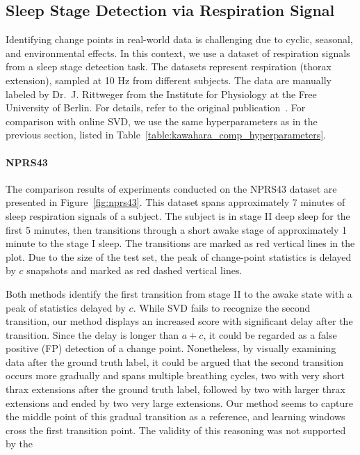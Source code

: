 \subsection{Sleep Stage Detection via Respiration Signal}
Identifying change points in real-world data is challenging due to cyclic, seasonal, and environmental effects. In this context, we use a dataset of respiration signals from a sleep stage detection task. The datasets represent respiration (thorax extension), sampled at 10 Hz from different subjects. The data are manually labeled by Dr.~J. Rittweger from the Institute for Physiology at the Free University of Berlin. For details, refer to the original publication~\cite{Keogh2005}. For comparison with online SVD, we use the same hyperparameters as in the previous section, listed in Table~\ref{table:kawahara_comp_hyperparameters}.

\paragraph{NPRS43}
The comparison results of experiments conducted on the NPRS43 dataset are presented in Figure~\ref{fig:nprs43}. This dataset spans approximately 7 minutes of sleep respiration signals of a subject. The subject is in stage II deep sleep for the first 5 minutes, then transitions through a short awake stage of approximately 1 minute to the stage I sleep. The transitions are marked as red vertical lines in the plot. Due to the size of the test set, the peak of change-point statistics is delayed by \(c\) snapshots and marked as red dashed vertical lines.

Both methods identify the first transition from stage II to the awake state with a peak of statistics delayed by \(c\). While SVD fails to recognize the second transition, our method displays an increased score with significant delay after the transition. Since the delay is longer than \(a + c\), it could be regarded as a false positive (FP) detection of a change point. Nonetheless, by visually examining data after the ground truth label, it could be argued that the second transition occurs more gradually and spans multiple breathing cycles, two with very short thrax extensions after the ground truth label, followed by two with larger thrax extensions and ended by two very large extensions. Our method seems to capture the middle point of this gradual transition as a reference, and learning windows cross the first transition point. The validity of this reasoning was not supported by the

